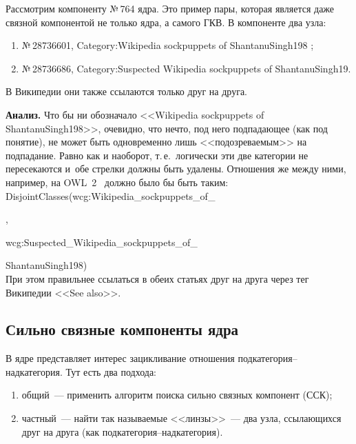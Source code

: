 \begin{multicols}{2}
   Рассмотрим компоненту №\,764 ядра. Это пример пары, которая является даже связной 
компонентой не только ядра, а самого ГКВ. В компоненте два узла:
\begin{enumerate}[(1)]   
\item
№\,28736601, Category:Wikipedia sockpuppets of ShantanuSingh198 ;
\item
№\,28736686, Category:Suspected Wikipedia sockpuppets of ShantanuSingh19.
\end{enumerate}
   
      В Википедии они также ссылаются только друг на друга.
      
      \vspace*{12pt}
   
   \textbf{Анализ.} Что бы ни обозначало <<Wikipedia sockpuppets of ShantanuSingh198>>, 
очевидно, что нечто, под него подпадающее (как под понятие), не может быть 
одновременно лишь <<подозреваемым>> на подпадание. Равно как и наоборот, 
т.\,е.\ логически эти две категории не пересекаются и~обе стрелки должны быть 
удалены. Отношения же между ними, например, на OWL~2~\cite{6-shk} должно было 
бы быть таким:\\

\noindent
 {\sf 
DisjointClasses(wcg:Wikipedia\_sockpuppets\_of\_}

, 

\noindent
{\sf wcg:Suspected\_Wikipedia\_sockpuppets\_of\_}

\noindent
{\sf ShantanuSingh198)}\\

   При этом правильнее ссылаться в обеих статьях друг на друга через тег Википедии <<See 
also>>.

\subsection{Сильно связные компоненты ядра}

   В ядре представляет интерес зацикливание отношения подкатегория--над\-ка\-те\-го\-рия. Тут 
есть два подхода:
   \begin{enumerate}[(1)]
   \item общий~--- применить алгоритм поиска сильно связных компонент (ССК);
   \item частный~--- найти так называемые <<линзы>>~--- два узла, ссылающихся друг на 
друга (как под\-ка\-те\-го\-рия--надкатегория). 
   \end{enumerate}
   

\end{multicols}
